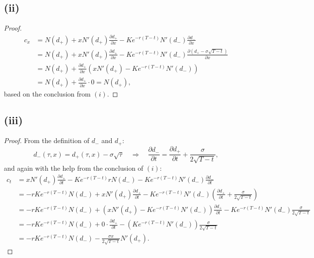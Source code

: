 \documentclass[final,3p,authoryear]{elsarticle}
\begin{document}
	\subsection{(ii)}
		\begin{proof}
			\begin{align}
				c_x &= N(d_+) + x N'(d_+) \frac{\partial d_+}{\partial x} - K e^{-r\left(T-t\right)} N'(d_-) \frac{\partial d_-}{\partial x}
				\nonumber\\
				&= N(d_+) + x N'(d_+) \frac{\partial d_+}{\partial x} - K e^{-r\left(T-t\right)} N'(d_-) \frac{\partial \left(d_+ - \sigma\sqrt{T-t}\right)}{\partial x}
				\nonumber\\
				&= N(d_+) + \frac{\partial d_+}{\partial x} \left(x N'(d_+) - K e^{-r\left(T-t\right)} N'(d_-)\right)
				\nonumber\\
				&= N(d_+) + \frac{\partial d_+}{\partial x} \cdot 0 = N(d_+)
				,
			\end{align}
			based on the conclusion from $\mathit{(i)}$.
		\end{proof}
		
	\subsection{(iii)}
		\begin{proof}
			From the definition of $d_-$ and $d_+$:
			\begin{equation}
				d_-(\tau,x)=d_+(\tau,x) - \sigma \sqrt{\tau}
				\quad\Rightarrow\quad
				\frac{\partial d_-}{\partial t} = \frac{\partial d_+}{\partial t} + \frac{\sigma}{2\sqrt{T-t}}
				,
			\end{equation}
			and again with the help from the conclusion of $\mathit{(i)}$:
			\begin{align}
				c_t &= x N'(d_+) \frac{\partial d_+}{\partial t} - K e^{-r\left(T-t\right)} r N(d_-) - K e^{-r\left(T-t\right)} N'(d_-) \frac{\partial d_-}{\partial t}
				\nonumber\\
				&= - r K e^{-r\left(T-t\right)} N(d_-) + x N'(d_+) \frac{\partial d_+}{\partial t} - K e^{-r\left(T-t\right)} N'(d_-) \left( \frac{\partial d_+}{\partial t} + \frac{\sigma}{2\sqrt{T-t}} \right)
				\nonumber\\
				&= - r K e^{-r\left(T-t\right)} N(d_-) + \left(x N'(d_+) - K e^{-r\left(T-t\right)} N'(d_-)\right) \frac{\partial d_+}{\partial t} - K e^{-r\left(T-t\right)} N'(d_-) \frac{\sigma}{2\sqrt{T-t}}
				\nonumber\\
				&= - r K e^{-r\left(T-t\right)} N(d_-) + 0\cdot \frac{\partial d_+}{\partial t} - \left(K e^{-r\left(T-t\right)} N'(d_-)\right) \frac{\sigma}{2\sqrt{T-t}}
				\nonumber\\
				&= - r K e^{-r\left(T-t\right)} N(d_-) - \frac{\sigma x}{2\sqrt{T-t}} N'(d_+)
				.
			\end{align}
		\end{proof}
	
\end{document}
